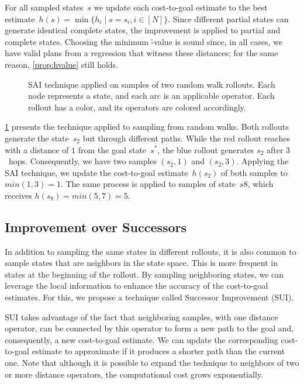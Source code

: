 For all sampled states~$s$ we update each cost-to-goal estimate to the best estimate~$h(s) = \min\{h_i \mid s=s_i, i\in[N]\}$. Since different partial states can generate identical complete states, the improvement is applied to partial and complete states. Choosing the minimum \h-value is sound since, in all cases, we have valid plans from a regression that witness these distances; for the same reason, \cref{prop:hvalue} still holds.

\begin{figure}[ht]
    \caption[SAI technique applied on samples of random walk rollouts.]{SAI technique applied on samples of two random walk rollouts. Each node represents a state, and each arc is an applicable operator. Each rollout has a color, and its operators are colored accordingly.}
    \label{fig:sai}
    \addmargin
    \centering
    
\end{figure}

\cref{fig:sai} presents the technique applied to sampling from random walks. Both rollouts generate the state~$s_2$ but through different paths. While the red rollout reaches with a distance of $1$ from the goal state~$s^*$, the blue rollout generates $s_2$ after $3$~hops. Consequently, we have two samples $(s_2,1)$ and $(s_2,3)$. Applying the SAI technique, we update the cost-to-goal estimate~$h(s_2)$ of both samples to $min(1,3)=1$. The same process is applied to samples of state~$s8$, which receives $h(s_8)=min(5,7)=5$.

\subsection{Improvement over Successors}
\label{sec:sui}

In addition to sampling the same states in different rollouts, it is also common to sample states that are neighbors in the state space. This is more frequent in states at the beginning of the rollout. By sampling neighboring states, we can leverage the local information to enhance the accuracy of the cost-to-goal estimates. For this, we propose a technique called Successor Improvement (SUI).

SUI takes advantage of the fact that neighboring samples, with one distance operator, can be connected by this operator to form a new path to the goal and, consequently, a new cost-to-goal estimate. We can update the corresponding cost-to-goal estimate to approximate \hstar if it produces a shorter path than the current one. Note that although it is possible to expand the technique to neighbors of two or more distance operators, the computational cost grows exponentially.

